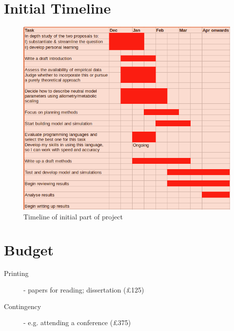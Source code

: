 \documentclass[11pt]{article}
\begin{document}
\section*{Initial Timeline}
\begin{figure}[h]
	\centering
	\includegraphics[width=0.8\linewidth]{GANTT.png}
	\caption{Timeline of initial part of project}
\end{figure}

\section*{Budget}
\begin{description}
\item [Printing] - papers for reading; dissertation (\pounds125)
\item [Contingency] - e.g. attending a conference (\pounds375)

\end{description}



\end{document}
